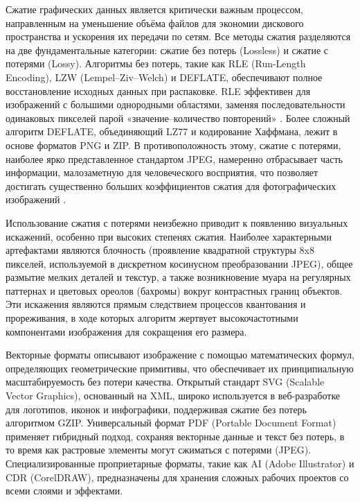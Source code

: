 \documentclass{SibFU-docs}
\begin{document}
Сжатие графических данных является критически важным процессом, направленным на уменьшение объёма файлов для экономии дискового пространства и ускорения их передачи по сетям. Все методы сжатия разделяются на две фундаментальные категории: сжатие без потерь (Lossless) и сжатие с потерями (Lossy). Алгоритмы без потерь, такие как RLE (Run-Length Encoding), LZW (Lempel–Ziv–Welch) и DEFLATE, обеспечивают полное восстановление исходных данных при распаковке. RLE эффективен для изображений с большими однородными областями, заменяя последовательности одинаковых пикселей парой «значение–количество повторений» \cite{rle-wiki}. Более сложный алгоритм DEFLATE, объединяющий LZ77 и кодирование Хаффмана, лежит в основе форматов PNG и ZIP. В противоположность этому, сжатие с потерями, наиболее ярко представленное стандартом JPEG, намеренно отбрасывает часть информации, малозаметную для человеческого восприятия, что позволяет достигать существенно больших коэффициентов сжатия для фотографических изображений \cite{jpeg-standard}.


Использование сжатия с потерями неизбежно приводит к появлению визуальных искажений, особенно при высоких степенях сжатия. Наиболее характерными артефактами являются блочность (проявление квадратной структуры 8x8 пикселей, используемой в дискретном косинусном преобразовании JPEG), общее размытие мелких деталей и текстур, а также возникновение муара на регулярных паттернах и цветовых ореолов (бахромы) вокруг контрастных границ объектов. Эти искажения являются прямым следствием процессов квантования и прореживания, в ходе которых алгоритм жертвует высокочастотными компонентами изображения для сокращения его размера.


Векторные форматы описывают изображение с помощью математических формул, определяющих геометрические примитивы, что обеспечивает их принципиальную масштабируемость без потери качества. Открытый стандарт SVG (Scalable Vector Graphics), основанный на XML, широко используется в веб-разработке для логотипов, иконок и инфографики, поддерживая сжатие без потерь алгоритмом GZIP. Универсальный формат PDF (Portable Document Format) применяет гибридный подход, сохраняя векторные данные и текст без потерь, в то время как растровые элементы могут сжиматься с потерями (JPEG). Специализированные проприетарные форматы, такие как AI (Adobe Illustrator) и CDR (CorelDRAW), предназначены для хранения сложных рабочих проектов со всеми слоями и эффектами.
\end{document}
